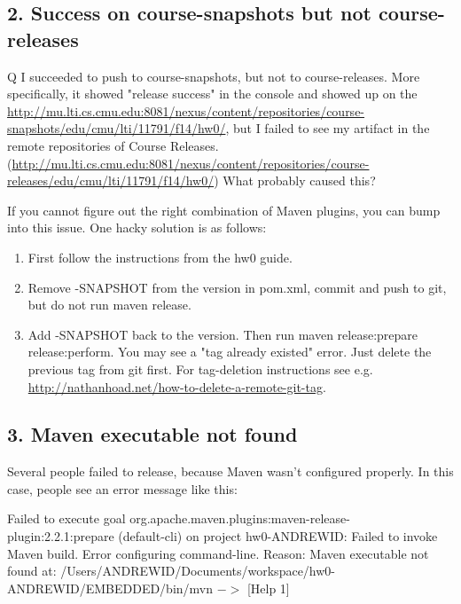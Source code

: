 \subsection{2. Success on course-snapshots but not course-releases}

\begin{qa}
\item[Q] I succeeded to push to course-snapshots, but not to course-releases. 
More specifically, it showed "release success" in the console and showed up on the \url{http://mu.lti.cs.cmu.edu:8081/nexus/content/repositories/course-snapshots/edu/cmu/lti/11791/f14/hw0/}, but I failed to see my artifact in the remote repositories of Course Releases. (\url{http://mu.lti.cs.cmu.edu:8081/nexus/content/repositories/course-releases/edu/cmu/lti/11791/f14/hw0/})  What probably caused this?
\end{qa}

If you cannot figure out the right combination of Maven plugins, you can bump into this issue.
One hacky solution is as follows:
\begin{enumerate}
\item First follow the instructions from the hw0 guide.
\item Remove -SNAPSHOT from the version in pom.xml, commit and push to git, but do not run maven release.
\item Add -SNAPSHOT back to the version. Then run maven release:prepare release:perform.
You may see a "tag already existed" error. Just delete the previous tag from git first.
For tag-deletion instructions see e.g. \url{http://nathanhoad.net/how-to-delete-a-remote-git-tag}.
\end{enumerate}

\subsection{3. Maven executable not found}
Several people failed to release, because Maven wasn't configured properly.
In this case, people see an error message like this:
\begin{qa}
\item[]
[ERROR] Failed to execute goal org.apache.maven.plugins:maven-release-plugin:2.2.1:prepare (default-cli) on project hw0-ANDREWID: Failed to invoke Maven build. Error configuring command-line. Reason: Maven executable not found at: /Users/ANDREWID/Documents/workspace/hw0-ANDREWID/EMBEDDED/bin/mvn $->$ [Help 1]
\end{qa}

